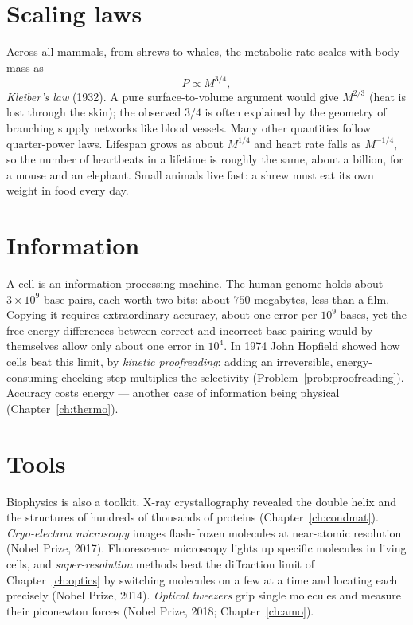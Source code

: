 \section{Scaling laws}

Across all mammals, from shrews to whales, the metabolic rate scales with body mass as
\[
  P\propto M^{3/4},
\]
\emph{Kleiber's law} (1932). A pure surface-to-volume argument would give $M^{2/3}$ (heat is lost through the skin); the observed $3/4$ is often explained by the geometry of branching supply networks like blood vessels. Many other quantities follow quarter-power laws. Lifespan grows as about $M^{1/4}$ and heart rate falls as $M^{-1/4}$, so the number of heartbeats in a lifetime is roughly the same, about a billion, for a mouse and an elephant. Small animals live fast: a shrew must eat its own weight in food every day.

\section{Information}

A cell is an information-processing machine. The human genome holds about $3\times10^{9}$ base pairs, each worth two bits: about $750$ megabytes, less than a film. Copying it requires extraordinary accuracy, about one error per $10^9$ bases, yet the free energy differences between correct and incorrect base pairing would by themselves allow only about one error in $10^4$. In 1974 John Hopfield showed how cells beat this limit, by \emph{kinetic proofreading}: adding an irreversible, energy-consuming checking step multiplies the selectivity (Problem~\ref{prob:proofreading}). Accuracy costs energy --- another case of information being physical (Chapter~\ref{ch:thermo}).

\section{Tools}

Biophysics is also a toolkit. X-ray crystallography revealed the double helix and the structures of hundreds of thousands of proteins (Chapter~\ref{ch:condmat}). \emph{Cryo-electron microscopy} images flash-frozen molecules at near-atomic resolution (Nobel Prize, 2017). Fluorescence microscopy lights up specific molecules in living cells, and \emph{super-resolution} methods beat the diffraction limit of Chapter~\ref{ch:optics} by switching molecules on a few at a time and locating each precisely (Nobel Prize, 2014). \emph{Optical tweezers} grip single molecules and measure their piconewton forces (Nobel Prize, 2018; Chapter~\ref{ch:amo}).

